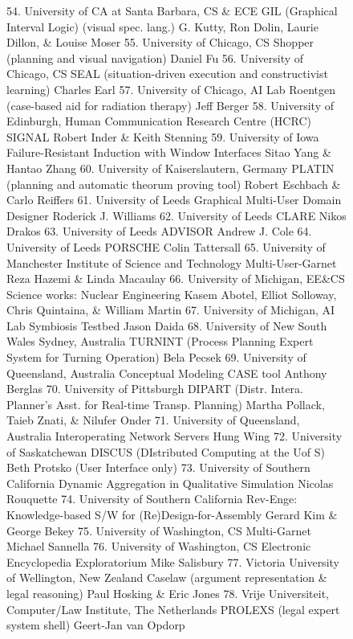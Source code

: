 \begin{figure}
\begin{figcol}
\newcolumn{}
54. University of CA at Santa Barbara, CS \& ECE
      GIL (Graphical Interval Logic) (visual spec. lang.)
      G. Kutty, Ron Dolin, Laurie Dillon,
         \& Louise Moser
55. University of Chicago, CS
      Shopper (planning and visual navigation)
      Daniel Fu
56. University of Chicago, CS
      SEAL (situation-driven execution and
         constructivist learning)
      Charles Earl
57. University of Chicago, AI Lab
      Roentgen (case-based aid for radiation therapy)
      Jeff Berger
58. University of Edinburgh, Human Communication
          Research Centre (HCRC)
      SIGNAL
      Robert Inder \& Keith Stenning
59. University of Iowa
      Failure-Resistant Induction with Window
         Interfaces
      Sitao Yang \& Hantao Zhang
60. University of Kaiserslautern, Germany
      PLATIN (planning and automatic theorum proving
         tool)
      Robert Eschbach \& Carlo Reiffers
61. University of Leeds
      Graphical Multi-User Domain Designer
      Roderick J. Williams
62. University of Leeds
      CLARE
      Nikos Drakos
63. University of Leeds
      ADVISOR
      Andrew J. Cole
64. University of Leeds
      PORSCHE
      Colin Tattersall
65. University of Manchester Institute of
         Science and Technology
      Multi-User-Garnet
      Reza Hazemi \& Linda Macaulay
66. University of Michigan, EE\&CS
      Science works: Nuclear Engineering
      Kasem Abotel, Elliot Solloway, Chris Quintaina,
         \& William Martin
67. University of Michigan, AI Lab
      Symbiosis Testbed
      Jason Daida
68. University of New South Wales Sydney, Australia
      TURNINT (Process Planning Expert System for
         Turning Operation)
      Bela Pecsek
69. University of Queensland, Australia
      Conceptual Modeling CASE tool
      Anthony Berglas
70. University of Pittsburgh
      DIPART (Distr. Intera. Planner's Asst. for
         Real-time Transp. Planning)
      Martha Pollack, Taieb Znati, \& Nilufer Onder
71. University of Queensland, Australia
      Interoperating Network Servers
      Hung Wing
72. University of Saskatchewan
      DISCUS (DIstributed Computing at the Uof S)
      Beth Protsko (User Interface only)
73. University of Southern California
      Dynamic Aggregation in Qualitative Simulation
      Nicolas Rouquette
74. University of Southern California
      Rev-Enge: Knowledge-based S/W for
        (Re)Design-for-Assembly
      Gerard Kim \& George Bekey
75. University of Washington, CS
      Multi-Garnet
      Michael Sannella
76. University of Washington, CS
      Electronic Encyclopedia Exploratorium
      Mike Salisbury
77. Victoria University of Wellington, New Zealand
      Caselaw (argument representation \& legal
        reasoning)
      Paul Hosking \& Eric Jones
78. Vrije Universiteit, Computer/Law Institute,
         The Netherlands
      PROLEXS (legal expert system shell)
      Geert-Jan van Opdorp
\end{figcol}
\end{figure}


